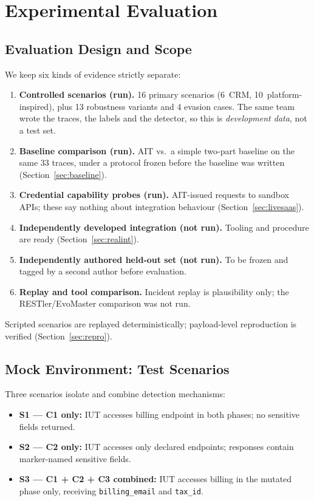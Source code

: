 \documentclass[12pt,a4paper]{report}
\begin{document}
\chapter{Experimental Evaluation}

\section{Evaluation Design and Scope}

We keep six kinds of evidence strictly separate:

\begin{enumerate}
    \item \textbf{Controlled scenarios (run).} 16 primary scenarios (6~CRM, 10~platform-inspired), plus 13 robustness variants and 4 evasion cases. The same team wrote the traces, the labels and the detector, so this is \emph{development data}, not a test set.
    \item \textbf{Baseline comparison (run).} AIT vs.\ a simple two-part baseline on the same 33 traces, under a protocol frozen before the baseline was written (Section~\ref{sec:baseline}).
    \item \textbf{Credential capability probes (run).} AIT-issued requests to sandbox APIs; these say nothing about integration behaviour (Section~\ref{sec:livesaas}).
    \item \textbf{Independently developed integration (not run).} Tooling and procedure are ready (Section~\ref{sec:realint}).
    \item \textbf{Independently authored held-out set (not run).} To be frozen and tagged by a second author before evaluation.
    \item \textbf{Replay and tool comparison.} Incident replay is plausibility only; the RESTler/EvoMaster comparison was not run.
\end{enumerate}

Scripted scenarios are replayed deterministically; payload-level reproduction is verified
(Section~\ref{sec:repro}).

\section{Mock Environment: Test Scenarios}

Three scenarios isolate and combine detection mechanisms:

\begin{itemize}
    \item \textbf{S1 --- C1 only:} IUT accesses billing endpoint in both phases; no sensitive fields returned.
    \item \textbf{S2 --- C2 only:} IUT accesses only declared endpoints; responses contain marker-named sensitive fields.
    \item \textbf{S3 --- C1 + C2 + C3 combined:} IUT accesses billing in the mutated phase only, receiving \texttt{billing\_email} and \texttt{tax\_id}.
\end{itemize}
\end{document}
